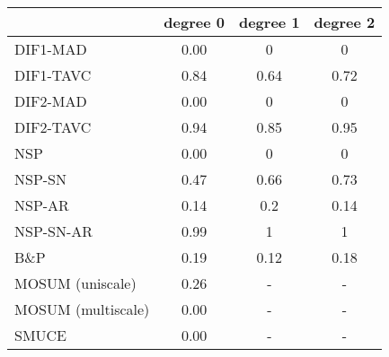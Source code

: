 \begin{tabular}{|l|c|c|c|}
  \hline
 & degree 0 & degree 1 & degree 2 \\ 
  \hline
DIF1-MAD & 0.00 & 0 & 0 \\ 
  DIF1-TAVC & 0.84 & 0.64 & 0.72 \\ 
  DIF2-MAD & 0.00 & 0 & 0 \\ 
  DIF2-TAVC & 0.94 & 0.85 & 0.95 \\ 
  NSP & 0.00 & 0 & 0 \\ 
  NSP-SN & 0.47 & 0.66 & 0.73 \\ 
  NSP-AR & 0.14 & 0.2 & 0.14 \\ 
  NSP-SN-AR & 0.99 & 1 & 1 \\ 
  B\&P & 0.19 & 0.12 & 0.18 \\ 
  MOSUM (uniscale) & 0.26 & - & - \\ 
  MOSUM (multiscale) & 0.00 & - & - \\ 
  SMUCE & 0.00 & - & - \\ 
   \hline
\end{tabular}

